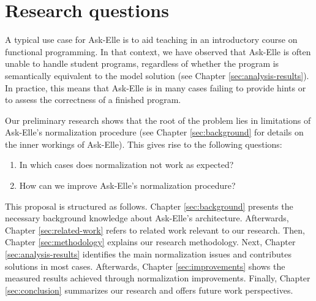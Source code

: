 \section{Research questions}
\label{sec:research-questions}

A typical use case for Ask-Elle is to aid teaching in an introductory course on functional programming. In that context, we have observed that Ask-Elle is often unable to handle student programs, regardless of whether the program is semantically equivalent to the model solution (see Chapter \ref{sec:analysis-results}). In practice, this means that Ask-Elle is in many cases failing to provide hints or to assess the correctness of a finished program.

Our preliminary research shows that the root of the problem lies in limitations of Ask-Elle's normalization procedure (see Chapter \ref{sec:background} for details on the inner workings of Ask-Elle). This gives rise to the following questions:

\begin{enumerate}
    \item In which cases does normalization not work as expected?
    \item How can we improve Ask-Elle's normalization procedure?
\end{enumerate}

This proposal is structured as follows. Chapter \ref{sec:background} presents the necessary background knowledge about Ask-Elle's architecture. Afterwards, Chapter \ref{sec:related-work} refers to related work relevant to our research. Then, Chapter \ref{sec:methodology} explains our research methodology. Next, Chapter \ref{sec:analysis-results} identifies the main normalization issues and contributes solutions in most cases. Afterwards, Chapter \ref{sec:improvements} shows the measured results achieved through normalization improvements. Finally, Chapter \ref{sec:conclusion} summarizes our research and offers future work perspectives.

